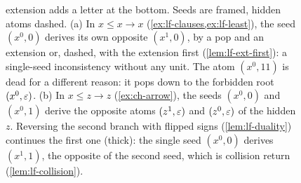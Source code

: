 \begin{figure}[tbp]
{extension adds a letter at the bottom. Seeds are framed, hidden atoms dashed.
(a) In $x\le x\to x$ (\cref{ex:lf-clauses,ex:lf-least}), the seed $(x^0,0)$
derives its own opposite $(x^1,0)$, by a pop and an extension or, dashed, with
the extension first (\cref{lem:lf-ext-first}): a single-seed inconsistency
without any unit. The atom $(x^0,11)$ is dead for a different reason: it pops
down to the forbidden root $(x^0,\varepsilon)$. (b) In $x\le z\to z$
(\cref{ex:ch-arrow}), the seeds $(x^0,0)$ and $(x^0,1)$ derive the opposite
atoms $(z^1,\varepsilon)$ and $(z^0,\varepsilon)$ of the hidden $z$. Reversing the second
branch with flipped signs (\cref{lem:lf-duality}) continues the first one (thick):
the single seed $(x^0,0)$ derives $(x^1,1)$, the opposite of the second seed,
which is collision return (\cref{lem:lf-collision}).}
\label{fig:lf-moves}
\end{figure}
